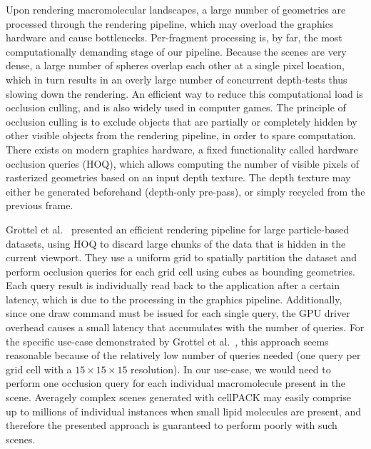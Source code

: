 Upon rendering macromolecular landscapes, a large number of geometries are processed through the rendering pipeline, which may overload the graphics hardware and cause bottlenecks.
Per-fragment processing is, by far, the most computationally demanding stage of our pipeline.
Because the scenes are very dense, a large number of spheres overlap each other at a single pixel location, which in turn results in an overly large number of concurrent depth-tests thus slowing down the rendering.
An efficient way to reduce this computational load is occlusion culling, and is also widely used in computer games.
The principle of occlusion culling is to exclude objects that are partially or completely hidden by other visible objects from the rendering pipeline, in order to spare computation.
There exists on modern graphics hardware, a fixed functionality called hardware occlusion queries (HOQ), which allows computing the number of visible pixels of rasterized geometries based on an input depth texture.
The depth texture may either be generated beforehand (depth-only pre-pass), or simply recycled from the previous frame.

Grottel et al.~\cite{grottel2010coherent} presented an efficient rendering pipeline for large particle-based datasets, using HOQ to discard large chunks of the data that is hidden in the current viewport.
They use a uniform grid to spatially partition the dataset and perform occlusion queries for each grid cell using cubes as bounding geometries.
Each query result is individually read back to the application after a certain latency, which is due to the processing in the graphics pipeline.
Additionally, since one draw command must be issued for each single query, the GPU driver overhead causes a small latency that accumulates with the number of queries.
For the specific use-case demonstrated by Grottel et al.~\cite{grottel2010coherent}, this approach seems reasonable because of the relatively low number of queries needed (one query per grid cell with a $15\times15\times15$ resolution).
In our use-case, we would need to perform one occlusion query for each individual macromolecule present in the scene.
Averagely complex scenes generated with cellPACK may easily comprise up to millions of individual instances when small lipid molecules are present, and therefore the presented approach is guaranteed to perform poorly with such scenes.

